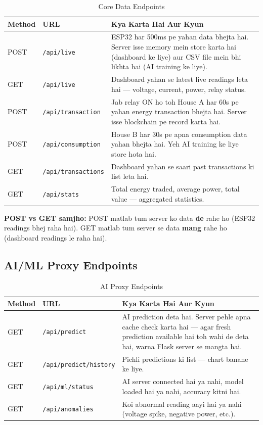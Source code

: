 \begin{table}[H]
\centering
\begin{tabularx}{\textwidth}{l l X}
\toprule
\textbf{Method} & \textbf{URL} & \textbf{Kya Karta Hai Aur Kyun} \\
\midrule
POST & \texttt{/api/live} & ESP32 har 500ms pe yahan data bhejta hai. Server isse memory mein store karta hai (dashboard ke liye) aur CSV file mein bhi likhta hai (AI training ke liye). \\
GET & \texttt{/api/live} & Dashboard yahan se latest live readings leta hai --- voltage, current, power, relay status. \\
POST & \texttt{/api/transaction} & Jab relay ON ho toh House A har 60s pe yahan energy transaction bhejta hai. Server isse blockchain pe record karta hai. \\
POST & \texttt{/api/consumption} & House B har 30s pe apna consumption data yahan bhejta hai. Yeh AI training ke liye store hota hai. \\
GET & \texttt{/api/transactions} & Dashboard yahan se saari past transactions ki list leta hai. \\
GET & \texttt{/api/stats} & Total energy traded, average power, total value --- aggregated statistics. \\
\bottomrule
\end{tabularx}
\caption{Core Data Endpoints}
\end{table}

\textbf{POST vs GET samjho:} POST matlab tum server ko data \textbf{de} rahe ho (ESP32 readings bhej raha hai). GET matlab tum server se data \textbf{mang} rahe ho (dashboard readings le raha hai).

\subsection{AI/ML Proxy Endpoints}

\begin{table}[H]
\centering
\begin{tabularx}{\textwidth}{l l X}
\toprule
\textbf{Method} & \textbf{URL} & \textbf{Kya Karta Hai Aur Kyun} \\
\midrule
GET & \texttt{/api/predict} & AI prediction deta hai. Server pehle apna cache check karta hai --- agar fresh prediction available hai toh wahi de deta hai, warna Flask server se mangta hai. \\
GET & \texttt{/api/predict/history} & Pichli predictions ki list --- chart banane ke liye. \\
GET & \texttt{/api/ml/status} & AI server connected hai ya nahi, model loaded hai ya nahi, accuracy kitni hai. \\
GET & \texttt{/api/anomalies} & Koi abnormal reading aayi hai ya nahi (voltage spike, negative power, etc.). \\
\bottomrule
\end{tabularx}
\caption{AI Proxy Endpoints}
\end{table}

